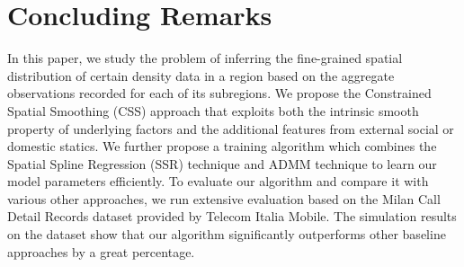 \section{Concluding Remarks}
\label{sec:conclude}

In this paper, we study the problem of inferring the fine-grained spatial distribution of certain density data in a region based on the aggregate observations recorded for each of its subregions.
We propose the Constrained Spatial Smoothing (CSS) approach that exploits both the intrinsic smooth property of underlying factors and the additional features from external social or domestic statics. We further propose a training algorithm which combines the Spatial Spline Regression (SSR) technique and ADMM technique to learn our model parameters efficiently. To evaluate our algorithm and compare it with various other approaches, we run extensive evaluation based on the Milan Call Detail Records dataset provided by Telecom Italia Mobile. The simulation results on the dataset show that our algorithm significantly outperforms other baseline approaches by a great percentage. 


